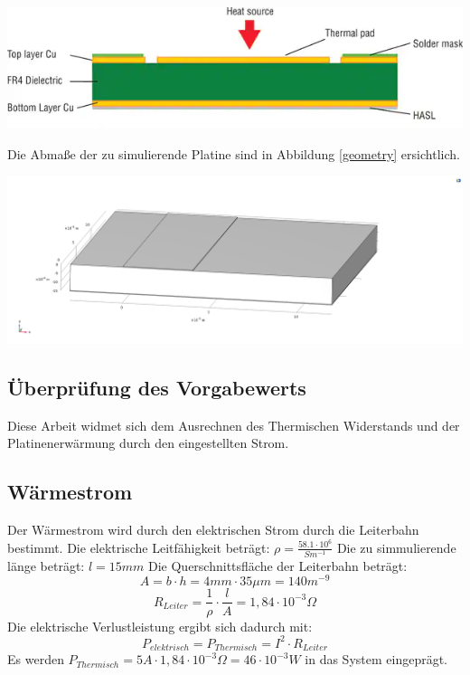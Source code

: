 \documentclass[10pt,a4paper,oneside,abstracton]{scrartcl}
\newenvironment{Figure}
  {\par\medskip\noindent\minipage{\linewidth}}
  {\endminipage\par\medskip}
\begin{document}
\begin{multicols}{2}
\begin{Figure}
	\includegraphics[width=\textwidth]{Bilder/PCB_Querschnitt.png}
	\label{pcb_im}
\end{Figure}
Die Abmaße der zu simulierende Platine sind in Abbildung \ref*{geometry} ersichtlich.
\begin{Figure}
	\includegraphics[width=\textwidth]{Bilder/Geometrie.png}
	\label{geometry}
\end{Figure}

 \subsection{Überprüfung des Vorgabewerts}
Diese Arbeit widmet sich dem Ausrechnen des Thermischen Widerstands und der 
Platinenerwärmung durch den eingestellten Strom. 

\subsection{Wärmestrom}
Der Wärmestrom wird durch den elektrischen Strom durch die Leiterbahn bestimmt. 
\newline
Die elektrische Leitfähigkeit beträgt:  $ \rho = \frac{58.1\cdot 10^6}{Sm^{-1}} $
\newline
Die zu simmulierende länge beträgt:  $l = 15 mm$
\newline
Die Querschnittsfläche der Leiterbahn beträgt: 
\begin{equation}
	A = b \cdot h = 4 mm \cdot 35 \mu m = 140 m^{-9}
\end{equation}
\begin{equation}
	R_{Leiter} = \frac{1}{\rho} \cdot \frac{l}{A} = 1,84 \cdot 10^{-3} \Omega
\end{equation}
Die elektrische Verlustleistung ergibt sich dadurch mit: 
\begin{equation}
	P_{elektrisch} = P_{Thermisch} =  I^2 \cdot R_{Leiter} 
\end{equation}
Es werden
$ P_{Thermisch} = 5A  \cdot 1,84 \cdot 10^{-3} \Omega = 46 \cdot 10^{-3} W $ \newline
in das System eingeprägt.


\end{multicols}
\end{document}
